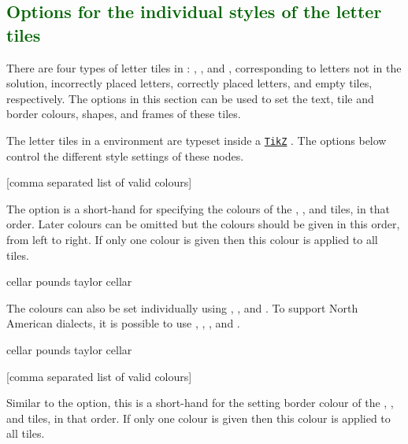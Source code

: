 \documentclass[svgnames]{report}
\newcommand\ctan[1]{\href{https://www.ctan.org/pkg/#1}{\texttt{#1}}}
\newcommand\Section[1]{\subsection{\textcolor{DarkGreen}{#1}}}
\begin{document}
  \Section{Options for the individual styles of the letter tiles}

  There are four types of letter tiles in :
  , ,  and
  , corresponding to letters not in the solution,
  incorrectly placed letters, correctly placed letters, and empty
  tiles, respectively. The options in this section can be used to set
  the text, tile and border colours, shapes, and frames of these tiles.

  The letter tiles in a  environment are typeset inside
  a \ctan{TikZ} \keyword{\node}. The options below control the different
  style settings of these nodes.

  [comma separated list of valid colours]

  The  option is a short-hand for specifying the colours
  of the , ,  and
   tiles, in that order. Later colours can be omitted but
  the colours should be given in this order, from left to right.
  If only one colour is given then this colour is applied to all tiles.

  \begin{example}
  \begin{wordle}[colours={LightGray,Orange,Teal}]{cellar}
    pounds
    taylor
    cellar
  \end{wordle}
  \end{example}

  The colours can also be set individually using ,
  ,  and .  To support North American dialects, it is possible to use
  , , ,
   and .

  \begin{example}
  \begin{wordle}[absent colour=DarkGray,present color=Salmon,
                 correct color=SeaGreen]{cellar}
    pounds
    taylor
    cellar
  \end{wordle}
  \end{example}

  [comma separated list of valid colours]

  Similar to the  option, this is a short-hand for the
  setting border colour of the , ,
   and  tiles, in that order.
  If only one colour is given then this colour is applied to all tiles.
\end{document}
